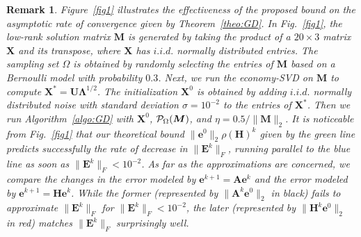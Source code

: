 \documentclass{article}
\def\P{{\cal P}}
\newcommand{\hlnew}[1]{{#1}}
\newtheorem{remark}{Remark}
\newcommand{\norm}[1]{\|#1\|} %
\begin{document}
\begin{remark}
Figure~\ref{fig1} illustrates the effectiveness of the proposed bound on the asymptotic rate of convergence given by Theorem~\ref{theo:GD}. 
\hlnew{In} Fig.~\ref{fig1}, \hlnew{the low-rank solution matrix $\bm M$ is generated by taking the product of a $20 \times 3$ matrix $\bm X$ and its transpose, where $\bm X$ has $i.i.d.$ normally distributed entries. The sampling set $\Omega$ is obtained by randomly selecting the entries of $\bm M$ based on a Bernoulli model with probability $0.3$.
Next, we run the economy-SVD on $\bm M$ to compute $\bm X^* = \bm U \bm \Lambda^{1/2}$. The initialization $\bm X^0$ is obtained by adding $i.i.d.$ normally distributed noise with standard deviation $\sigma=10^{-2}$ to the entries of $\bm X^*$.}
Then we run Algorithm~\ref{algo:GD} \hlnew{with $\bm X^0$, $\P_\Omega(\bm M)$, and $\eta = 0.5/\norm{\bm M}_2$.}
It is noticeable from Fig.~\ref{fig1} that our theoretical bound $\norm{\bm e^0}_2 \rho(\bm H)^k$ \hlnew{given by the green line predicts successfully the rate of decrease in $\norm{\bm E^k}_F$, running parallel to the blue line as soon as $\norm{\bm E^k}_F < 10^{-2}$. As far as the approximations are concerned, we compare the changes in the error modeled by $\bm e^{k+1}=\bm A \bm e^k$ and the error modeled by $\bm e^{k+1}=\bm H \bm e^k$.
While the former (represented by $\norm{\bm A^k \bm e^0}_2$ in black) fails to approximate $\norm{\bm E^k}_F$ for $\norm{\bm E^k}_F < 10^{-2}$, the later (represented by $\norm{\bm H^k \bm e^0}_2$ in red) matches $\norm{\bm E^k}_F$ surprisingly well.} 
\end{remark}
\end{document}
